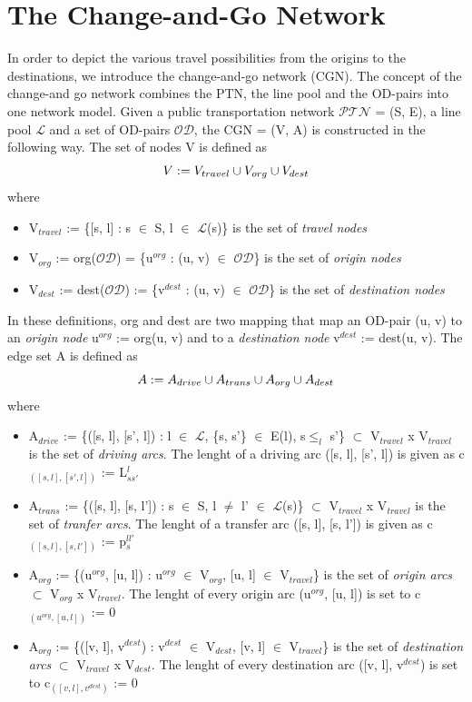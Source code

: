 \documentclass[
  twoside,
  12pt, a4paper,
  footinclude=true,
  headinclude=true,
  cleardoublepage=empty
]{scrbook}
\theoremstyle{definition}
\begin{document}
\section{The Change-and-Go Network}
In order to depict the various travel possibilities from the origins to the destinations, we introduce the change-and-go network (CGN). The concept of the change-and go network combines the PTN, the line pool and the OD-pairs into one network model. \newline 
Given a public transportation network $\mathcal{PTN}$ = (S, E), a line pool $\mathcal{L}$ and a set of OD-pairs $\mathcal{OD}$, the CGN = (V, A) is constructed in the following way. \newline
The set of nodes V is defined as
\begin{equation} \notag
V := V_{travel} \cup V_{org} \cup V_{dest}
\end{equation}
where
\begin{itemize}
\item V$_{travel}$ := \{[s, l] : s $\in$ S, l $\in$ $\mathcal{L}$(s)\} is the set of \emph{travel nodes}
\item V$_{org}$ := org($\mathcal{OD}$) = \{u$^{org}$ : (u, v) $\in$ $\mathcal{OD}$\} is the set of \emph{origin nodes}
\item V$_{dest}$ := dest($\mathcal{OD}$) := \{v$^{dest}$ : (u, v) $\in$ $\mathcal{OD}$\} is the set of \emph{destination nodes}
\end{itemize}
In these definitions, org and dest are two mapping that map an OD-pair (u, v) to an \emph{origin node} u$^{org}$ := org(u, v) and to a \emph{destination node} v$^{dest}$ := dest(u, v). \newline
The edge set A is defined as
\begin{equation} \notag
A := A_{drive} \cup A_{trans} \cup A_{org} \cup A_{dest}
\end{equation}
where
\begin{itemize}
\item A$_{drive}$ := \{([s, l], [s', l]) : l $\in$ $\mathcal{L}$, \{s, s'\} $\in$ E(l), s$\le_{l}$ s'\} $\subset$ V$_{travel}$ x V$_{travel}$ is the set of \emph{driving arcs}. The lenght of a driving arc ([s, l], [s', l]) is given as c$_{([s, l], [s', l])}$ := L$^l_{ss'}$
\item A$_{trans}$ := \{([s, l], [s, l']) : s $\in$ S, l $\ne$ l' $\in$ $\mathcal{L}$(s)\} $\subset$ V$_{travel}$ x V$_{travel}$ is the set of \emph{tranfer arcs}. The lenght of a transfer arc ([s, l], [s, l'])  is given as c$_{([s, l], [s, l'])}$ := p$^{ll'}_s$
\item A$_{org}$ := \{(u$^{org}$, [u, l]) : u$^{org}$ $\in$  V$_{org}$, [u, l] $\in$ V$_{travel}$\} is the set of \emph{origin arcs} $\subset$ V$_{org}$ x V$_{travel}$. The lenght of every origin arc (u$^{org}$, [u, l]) is set to c$_{(u^{org}, [u, l])}$ := 0
\item A$_{org}$ := \{([v, l], v$^{dest}$) : v$^{dest}$ $\in$  V$_{dest}$, [v, l] $\in$ V$_{travel}$\} is the set of \emph{destination arcs} $\subset$ V$_{travel}$ x V$_{dest}$. The lenght of every destination arc ([v, l], v$^{dest}$) is set to c$_{([v, l], v^{dest})}$ := 0
\end{itemize} 
\end{document}
